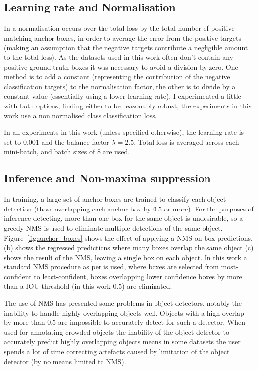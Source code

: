 \subsection {Learning rate and Normalisation}

In \cite{Lin2017} a normalisation occurs over the total loss by the total number of positive matching anchor boxes, in order to average the error from the positive targets (making an assumption that the negative targets contribute a negligible amount to the total loss). As the datasets used in this work often don't contain any positive ground truth boxes it was necessary to avoid a division by zero. One method is to add a constant (representing the contribution of the negative classification targets) to the normalisation factor, the other is to divide by a constant value (essentially using a lower learning rate). I experimented a little with both options, finding either to be reasonably robust, the experiments in this work use a non normalised class classification loss.

In all experiments in this work (unless specified otherwise), the learning rate is set to $0.001$ and the balance factor $\lambda=2.5$. Total loss is averaged across each mini-batch, and batch sizes of $8$ are used.

\subsection{Inference and Non-maxima suppression}

In training, a large set of anchor boxes are trained to classify each object detection (those overlapping each anchor box by $0.5$ or more). For the purposes of inference detecting, more than one box for the same object is undesirable, so a greedy \gls{NMS} is used to eliminate multiple detections of the same object. Figure~\ref{fig:anchor_boxes} shows the effect of applying a \gls{NMS} on box predictions, (b) shows the regressed predictions where many boxes overlap the same object (c) shows the result of the \gls{NMS}, leaving a single box on each object. In this work a standard \gls{NMS} procedure as per \cite{Wang2017} is used, where boxes are selected from most-confident to least-confident, boxes overlapping lower confidence boxes by more than a \gls{IOU} threshold (in this work $0.5$) are eliminated.

The use of \gls{NMS} has presented some problems in object detectors, notably the inability to handle highly overlapping objects well. Objects with a high overlap by more than $0.5$ are impossible to accurately detect for such a detector. When used for annotating crowded objects the inability of the object detector to accurately predict highly overlapping objects means in some datasets the user spends a lot of time correcting artefacts caused by limitation of the object detector (by no means limited to \gls{NMS}).


